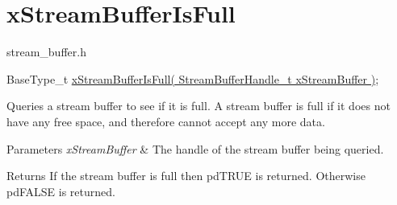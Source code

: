 \hypertarget{group__xStreamBufferIsFull}{}\section{x\+Stream\+Buffer\+Is\+Full}
\label{group__xStreamBufferIsFull}
stream\+\_\+buffer.\+h


\begin{DoxyPre}
BaseType\_t \hyperlink{stream__buffer_8h_ae393d82ee06e89692248a4381f85dc86}{xStreamBufferIsFull( StreamBufferHandle\_t xStreamBuffer )};
\end{DoxyPre}


Queries a stream buffer to see if it is full. A stream buffer is full if it does not have any free space, and therefore cannot accept any more data.


\begin{DoxyParams}{Parameters}
{\em x\+Stream\+Buffer} & The handle of the stream buffer being queried.\\
\hline
\end{DoxyParams}
\begin{DoxyReturn}{Returns}
If the stream buffer is full then pd\+T\+R\+UE is returned. Otherwise pd\+F\+A\+L\+SE is returned. 
\end{DoxyReturn}
